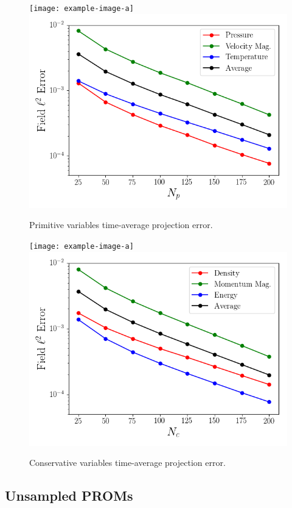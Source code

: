 \begin{figure}
	\begin{minipage}{0.48\linewidth}
		\ifdefined\DRAFT
			\texttt{[image: example-image-a]}
		\else
			\includegraphics[width=0.99\linewidth,trim={0.5em 0.5em 0.5em 0.5em},clip]{Chapters/CavityAndCVRC/Images/cavity/projection_error_primitive.png}
		\fi
		\caption{\label{fig:cavityProjErrPrim}Primitive variables time-average projection error.}
	\end{minipage} \hspace{0.5em}
	\begin{minipage}{0.48\linewidth}
		\ifdefined\DRAFT
			\texttt{[image: example-image-a]}
		\else
			\includegraphics[width=0.99\linewidth,trim={0.5em 0.5em 0.5em 0.5em},clip]{Chapters/CavityAndCVRC/Images/cavity/projection_error_conservative.png}
		\fi
		\caption{\label{fig:cavityProjErrCons}Conservative variables time-average projection error.}
	\end{minipage}
\end{figure}

\subsection{Unsampled PROMs}
